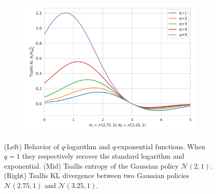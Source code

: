 \documentclass{article}
\newcommand{\qlog}{$q$-logarithm }
\begin{document}
\begin{figure}
\begin{subfigure}[b]{0.3\textwidth}
        \includegraphics[width=\textwidth]{img/tsallis_kl.png}
    \end{subfigure}
    \caption{(Left) Behavior of \qlog and $q$-exponential functions.
    When $q=1$ they respectively recover the standard logarithm and exponential.
    (Mid) Tsallis entropy of the Gaussian policy $\mathcal{N}(2, 1)$. (Right) Tsallis KL divergence between two Gaussian policies $\mathcal{N}(2.75, 1)$ and $\mathcal{N}(3.25, 1)$.
    }
    \label{fig:q_stats}
\end{figure}
\end{document}
